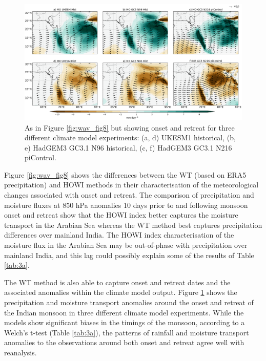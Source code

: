 \begin{figure}[t!]
\centering
 \includegraphics[width=\linewidth]{figures/ind_models.png}
\caption[Indian monsoon precipitation anomalies associated with onset]{ As in Figure \ref{fig:wav_fig8} but showing onset and retreat for three different climate model experiments: (a, d) UKESM1 historical, (b, e) HadGEM3 GC3.1 N96 historical, (c, f) HadGEM3 GC3.1 N216 piControl.   }
\label{fig:indmodels}
\end{figure}

Figure \ref{fig:wav_fig8} shows the differences between the WT (based on ERA5 precipitation) and HOWI methods in their characterisation of the meteorological changes associated with onset and retreat. 
The comparison of precipitation and moisture fluxes at 850 hPa anomalies 10 days prior to and following monsoon onset and retreat show that the HOWI index better captures the moisture transport in the Arabian Sea whereas the WT method best captures precipitation differences over mainland India. The HOWI index characterisation of the moisture flux in the Arabian Sea may be out-of-phase with precipitation over mainland India, and this lag could possibly explain some of the results of Table \ref{tab:3a}.


 The WT method is also able to capture onset and retreat dates and the associated anomalies within the climate model output. Figure \ref{fig:indmodels} shows the precipitation and moisture transport anomalies around the onset and retreat of the Indian monsoon in three different climate model experiments. While the models show significant biases in the timings of the monsoon, according to a Welch's t-test (Table \ref{tab:3a}), the patterns of rainfall and moisture transport anomalies to the observations around both onset and retreat agree well with reanalysis.

